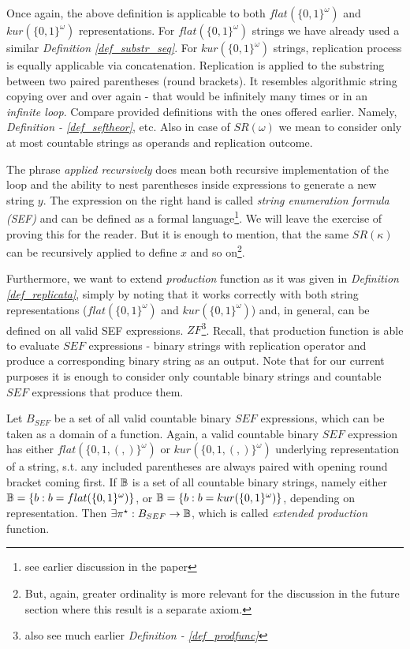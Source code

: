 Once again, the above definition is applicable to both $flat(\{0,1\}^\omega)$ and $kur(\{0,1\}^\omega)$ representations. For $flat(\{0,1\}^\omega)$ strings we have already used a similar \textit{Definition \ref{def_substr_seq}}. For $kur(\{0,1\}^\omega)$ strings, replication process is equally applicable via concatenation. Replication is applied to the substring between two paired parentheses (round brackets). It resembles algorithmic string copying over and over again - that would be infinitely many times or in an \textit{infinite loop}. Compare provided definitions with the ones offered earlier. Namely, \textit{Definition - \ref{def_seftheor}}, etc. Also in case of $SR(\omega)$ we mean to consider only at most countable strings as operands and replication outcome.

The phrase \textit{applied recursively} does mean both recursive implementation of the loop and the ability to nest parentheses inside expressions to generate a new string $y$. The expression on the right hand is called \textit{string enumeration formula (SEF)} and can be defined as a formal language\footnote{see earlier discussion in the paper}. We will leave the exercise of proving this for the reader. But it is enough to mention, that the same $SR(\kappa)$ can be recursively applied to define $x$ and so on\footnote{But, again, greater ordinality is more relevant for the discussion in the future section where this result is a separate axiom.}.

Furthermore, we want to extend \textit{production} function as it was given in \textit{Definition \ref{def_replicata}}, simply by noting that it works correctly with both string representations ($flat(\{0,1\}^\omega)$ and $kur(\{0,1\}^\omega)$) and, in general, can be defined on all valid SEF expressions. $ZF$\footnote{also see much earlier \textit{Definition - \ref{def_prodfunc}}}. Recall, that production function is able to evaluate $SEF$ expressions - binary strings with replication operator and produce a corresponding binary string as an output. Note that for our current purposes it is enough to consider only countable binary strings and countable $SEF$ expressions that produce them.

\begin{definition}\label{def_ext_prodfunc_zf}
    Let $B_{SEF}$ be a set of all valid countable binary $SEF$ expressions, which can be taken as a domain of a function. Again, a valid countable binary $SEF$ expression has either $flat(\{0,1,(,)\}^\omega)$ or $kur(\{0,1,(,)\}^\omega)$ underlying representation of a string, s.t. any included parentheses are always paired with opening round bracket coming first. If $\mathbb{B}$ is a set of all countable binary strings, namely either $\mathbb{B} = \{b : b = flat(\{0,1\}^\omega)\}$, or $\mathbb{B} = \{b : b = kur(\{0,1\}^\omega)\}$, depending on representation. Then $\exists \pi^\star: B_{SEF} \to \mathbb{B}$, which is called \textit{extended production} function.
\end{definition}

